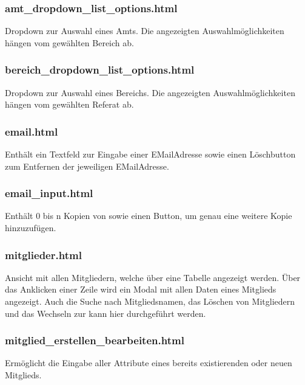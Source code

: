 \documentclass[letterpaper,10pt,english]{sphinxmanual}
\begin{document}
\subsubsection{amt\_dropdown\_list\_options.html}
\label{\detokenize{masterCodeDoc:amt-dropdown-list-options-html}}
Dropdown zur Auswahl eines Amts. Die angezeigten Auswahlmöglichkeiten hängen vom gewählten Bereich ab.


\subsubsection{bereich\_dropdown\_list\_options.html}
\label{\detokenize{masterCodeDoc:bereich-dropdown-list-options-html}}
Dropdown zur Auswahl eines Bereichs. Die angezeigten Auswahlmöglichkeiten hängen vom gewählten Referat ab.


\subsubsection{email.html}
\label{\detokenize{masterCodeDoc:email-html}}
Enthält ein Textfeld zur Eingabe einer E\sphinxhyphen{}Mail\sphinxhyphen{}Adresse sowie einen Löschbutton zum Entfernen der jeweiligen E\sphinxhyphen{}Mail\sphinxhyphen{}Adresse.


\subsubsection{email\_input.html}
\label{\detokenize{masterCodeDoc:email-input-html}}
Enthält 0 bis n Kopien von  sowie einen Button, um genau eine weitere Kopie hinzuzufügen.


\subsubsection{mitglieder.html}
\label{\detokenize{masterCodeDoc:mitglieder-html}}
Ansicht mit allen Mitgliedern, welche über eine Tabelle angezeigt werden. Über das Anklicken einer Zeile wird ein Modal mit allen Daten eines Mitglieds angezeigt.
Auch die Suche nach Mitgliedsnamen, das Löschen von Mitgliedern und das Wechseln zur  kann hier durchgeführt werden.


\subsubsection{mitglied\_erstellen\_bearbeiten.html}
\label{\detokenize{masterCodeDoc:mitglied-erstellen-bearbeiten-html}}
Ermöglicht die Eingabe aller Attribute eines bereits existierenden oder neuen Mitglieds.
\end{document}
